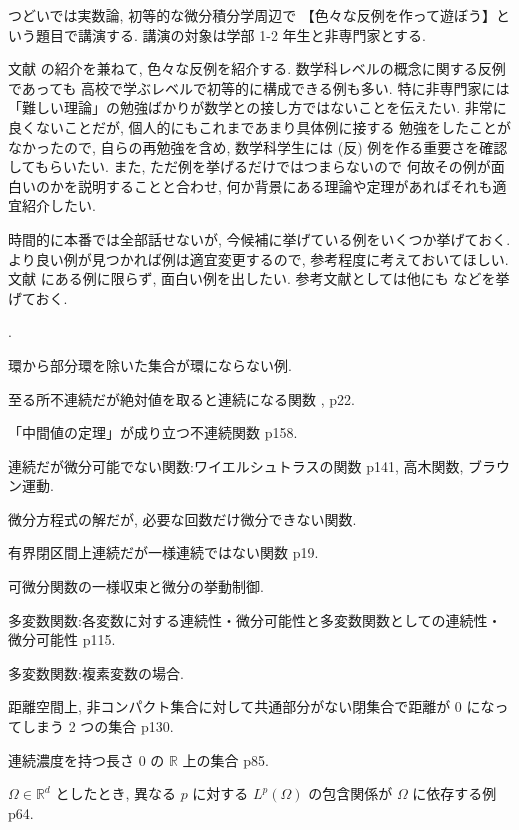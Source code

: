 \documentclass[openany, a4paper, oneside]{jsbook}
\newcounter{enum2}
\renewenvironment{enumerate}{%
\begin{list}%
{%
\arabic{enum2}.\ \,%
}%
{%
\usecounter{enum2}
\setlength{\itemindent}{0pt}%
\setlength{\leftmargin}{15pt}%
\setlength{\rightmargin}{0pt}%
\setlength{\labelsep}{0pt}%
\setlength{\labelwidth}{6pt}%
\setlength{\itemsep}{0pt}%
\setlength{\parsep}{0pt}%
\setlength{\listparindent}{0pt}%
}
}{%
\end{list}%
}
\theoremstyle{break}
\theoremstyle{breakdefn}
\begin{document}
つどいでは実数論, 初等的な微分積分学周辺で
【色々な反例を作って遊ぼう】という題目で講演する.
講演の対象は学部 1-2 年生と非専門家とする.

文献 \cite{GelbaumOlmsted1} の紹介を兼ねて, 色々な反例を紹介する.
数学科レベルの概念に関する反例であっても
高校で学ぶレベルで初等的に構成できる例も多い.
特に非専門家には「難しい理論」の勉強ばかりが数学との接し方ではないことを伝えたい.
非常に良くないことだが, 個人的にもこれまであまり具体例に接する
勉強をしたことがなかったので, 自らの再勉強を含め,
数学科学生には (反) 例を作る重要さを確認してもらいたい.
また, ただ例を挙げるだけではつまらないので
何故その例が面白いのかを説明することと合わせ,
何か背景にある理論や定理があればそれも適宜紹介したい.

時間的に本番では全部話せないが, 今候補に挙げている例をいくつか挙げておく.
より良い例が見つかれば例は適宜変更するので, 参考程度に考えておいてほしい.
文献 \cite{GelbaumOlmsted1} にある例に限らず, 面白い例を出したい.
参考文献としては他にも \cite{HikosaburoKomatsu1, DavidWilliams1, WilliamDumham1} などを挙げておく.

\begin{enumerate}
\item 環から部分環を除いた集合が環にならない例.
\item 至る所不連続だが絶対値を取ると連続になる関数 \cite{GelbaumOlmsted1}, p22.
\item 「中間値の定理」が成り立つ不連続関数 \cite{WilliamDumham1} p158.
\item 連続だが微分可能でない関数:ワイエルシュトラスの関数 \cite{WilliamDumham1} p141, 高木関数, ブラウン運動.
\item 微分方程式の解だが, 必要な回数だけ微分できない関数.
\item 有界閉区間上連続だが一様連続ではない関数 \cite{GelbaumOlmsted1} p19.
\item 可微分関数の一様収束と微分の挙動制御.
\item 多変数関数:各変数に対する連続性・微分可能性と多変数関数としての連続性・微分可能性 \cite{GelbaumOlmsted1} p115.
\item 多変数関数:複素変数の場合.
\item 距離空間上, 非コンパクト集合に対して共通部分がない閉集合で距離が 0 になってしまう 2 つの集合 \cite{GelbaumOlmsted1} p130.
\item 連続濃度を持つ長さ 0 の $\mathbb{R}$ 上の集合 \cite{GelbaumOlmsted1} p85.
\item $\Omega \in \mathbb{R}^d$ としたとき, 異なる $p$ に対する $L^p (\Omega)$ の包含関係が $\Omega$ に依存する例 \cite{DavidWilliams1} p64.
\end{enumerate}
\end{document}
